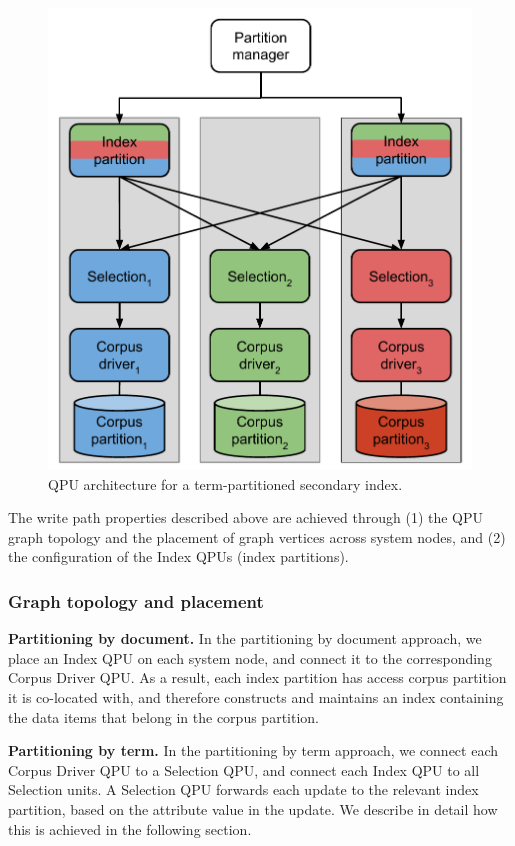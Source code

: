 \begin{figure}
\begin{minipage}{.5\textwidth}
    \includegraphics[scale=0.5]{./figures/case_studies/index_partitioned_by_term.pdf}
    \caption{QPU architecture for a term-partitioned secondary index.}
    \label{fig:index_partitioned_by_term}
  \end{minipage}
\end{figure}

The write path properties described above are achieved through (1) the QPU graph topology and the placement of graph vertices across system nodes,
and (2) the configuration of the Index QPUs (index partitions).

\subsubsection{Graph topology and placement}

\medskip
\noindent
\textbf{Partitioning by document.}
In the partitioning by document approach, we place an Index QPU on each system node,
and connect it to the corresponding Corpus Driver QPU.
As a result, each index partition has access corpus partition it is co-located with,
and therefore constructs and maintains an index containing the data items that belong in the corpus partition.

\medskip
\noindent
\textbf{Partitioning by term.}
In the partitioning by term approach,
we connect each Corpus Driver QPU to a Selection QPU,
and connect each Index QPU to all Selection units.
A Selection QPU forwards each update to the relevant index partition,
based on the attribute value in the update.
We describe in detail how this is achieved in the following section.
